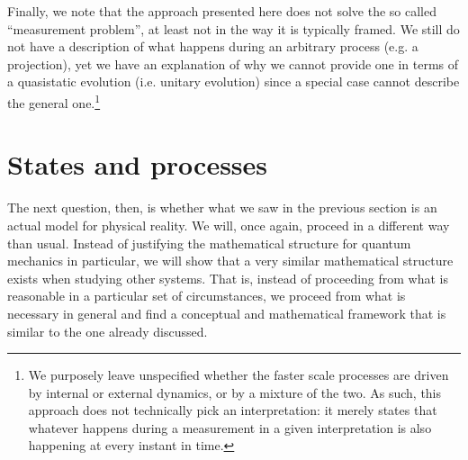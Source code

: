 \documentclass[applsci,article,submit,moreauthors,pdftex]{Definitions/mdpi}
\begin{document}
Finally, we note that the approach presented here does not solve the so called ``measurement problem''\cite{Genovese,Bassi}, at least not in the way it is typically framed. We still do not have a description of what happens during an arbitrary process (e.g. a projection), yet we have an explanation of why we cannot provide one in terms of a quasistatic evolution (i.e. unitary evolution) since a special case cannot describe the general one.\footnote{We purposely leave unspecified whether the faster scale processes are driven by internal or external dynamics, or by a mixture of the two. As such, this approach does not technically pick an interpretation: it merely states that whatever happens during a measurement in a given interpretation is also happening at every instant in time.}



\section{States and processes}

The next question, then, is whether what we saw in the previous section is an actual model for physical reality. We will, once again, proceed in a different way than usual. Instead of justifying the mathematical structure for quantum mechanics in particular, we will show that a very similar mathematical structure exists when studying other systems. That is, instead of proceeding from what is reasonable in a particular set of circumstances, we proceed from what is necessary in general and find a conceptual and mathematical framework that is similar to the one already discussed.
\end{document}
